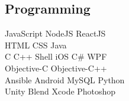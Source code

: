 \documentclass[]{deedy-resume-openfont}
\begin{document}
\begin{minipage}[t]{0.33\textwidth}
\subsection{Programming}
JavaScript \textbullet{} NodeJS \textbullet{} ReactJS\\ 
 \textbullet{} HTML \textbullet{} CSS \textbullet{} Java  \\ 
C \textbullet{} C++ \textbullet{} Shell \textbullet{} iOS \textbullet{} C\#\textbullet{} WPF\\
Objective-C \textbullet{} Objective-C++ \\
Ansible  \textbullet{} Android \textbullet{} MySQL\textbullet{} Python\\
Unity \textbullet{} Blend \textbullet{} Xcode \textbullet{} Photoshop
\sectionsep

%
%

\end{minipage} 
\hfill
\end{document}
